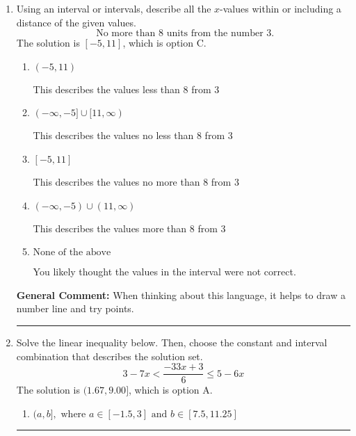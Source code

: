 \documentclass{extbook}[14pt]
\newcommand{\litem}[1]{\item #1

\rule{\textwidth}{0.4pt}}
\begin{document}
\begin{enumerate}
{\begin{enumerate}[label=\Alph*.]
 $[0.375, \infty)$, which corresponds to switching the direction of the interval. You likely did this if you did not flip the inequality when dividing by a negative!
\item \( (-\infty, a], \text{ where } a \in [-0.2, 0.56] \)

* $(-\infty, 0.375]$, which is the correct option.
\item \( (-\infty, a], \text{ where } a \in [-1.11, 0.15] \)

 $(-\infty, -0.375]$, which corresponds to negating the endpoint of the solution.
\item \( \text{None of the above}. \)

You may have chosen this if you thought the inequality did not match the ends of the intervals.
\end{enumerate}

\textbf{General Comment:} Remember that less/greater than or equal to includes the endpoint, while less/greater do not. Also, remember that you need to flip the inequality when you multiply or divide by a negative.
}
\litem{
Using an interval or intervals, describe all the $x$-values within or including a distance of the given values.
\[ \text{ No more than } 8 \text{ units from the number } 3. \]The solution is \( [-5, 11] \), which is option C.\begin{enumerate}[label=\Alph*.]
\item \( (-5, 11) \)

This describes the values less than 8 from 3
\item \( (-\infty, -5] \cup [11, \infty) \)

This describes the values no less than 8 from 3
\item \( [-5, 11] \)

This describes the values no more than 8 from 3
\item \( (-\infty, -5) \cup (11, \infty) \)

This describes the values more than 8 from 3
\item \( \text{None of the above} \)

You likely thought the values in the interval were not correct.
\end{enumerate}

\textbf{General Comment:} When thinking about this language, it helps to draw a number line and try points.
}
\litem{
Solve the linear inequality below. Then, choose the constant and interval combination that describes the solution set.
\[ 3 - 7 x < \frac{-33 x + 3}{6} \leq 5 - 6 x \]The solution is \( (1.67, 9.00] \), which is option A.\begin{enumerate}[label=\Alph*.]
\item \( (a, b], \text{ where } a \in [-1.5, 3] \text{ and } b \in [7.5, 11.25] \)


\end{enumerate}}
\end{enumerate}
\end{document}
